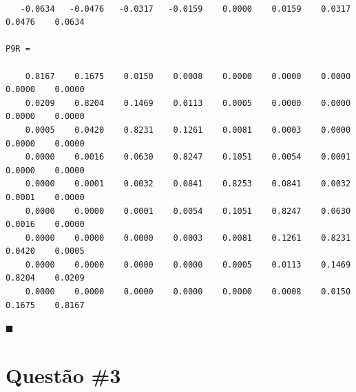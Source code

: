 \documentclass[10pt]{article}
\newcommand*{\QEDA}{\hfill\ensuremath{\blacksquare}}%
\newcommand\0{\mathbf{0}}
\newenvironment{sol}
    {\\[1em] {\color{magenta}\text{Resposta.}}
    }
    {{\color{blue!50!black}\QEDA}}
\begin{document}
\begin{sol}
\begin{lstlisting}
   -0.0634   -0.0476   -0.0317   -0.0159    0.0000    0.0159    0.0317    0.0476    0.0634

P9R =

    0.8167    0.1675    0.0150    0.0008    0.0000    0.0000    0.0000    0.0000    0.0000
    0.0209    0.8204    0.1469    0.0113    0.0005    0.0000    0.0000    0.0000    0.0000
    0.0005    0.0420    0.8231    0.1261    0.0081    0.0003    0.0000    0.0000    0.0000
    0.0000    0.0016    0.0630    0.8247    0.1051    0.0054    0.0001    0.0000    0.0000
    0.0000    0.0001    0.0032    0.0841    0.8253    0.0841    0.0032    0.0001    0.0000
    0.0000    0.0000    0.0001    0.0054    0.1051    0.8247    0.0630    0.0016    0.0000
    0.0000    0.0000    0.0000    0.0003    0.0081    0.1261    0.8231    0.0420    0.0005
    0.0000    0.0000    0.0000    0.0000    0.0005    0.0113    0.1469    0.8204    0.0209
    0.0000    0.0000    0.0000    0.0000    0.0000    0.0008    0.0150    0.1675    0.8167
\end{lstlisting}
\end{sol}
\section*{Questão \#3}
\end{document}
